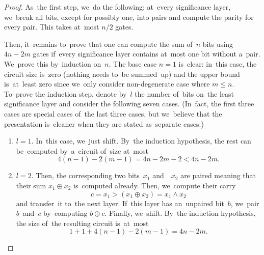 \documentclass[sigconf, review, anonymous]{acmart}
\begin{document}
\begin{proof}
    As~the first step, we~do the following: at~every significance layer,
    we~break all bits, except for possibly one, into pairs and compute
    the parity for every pair. This takes at~most $n/2$ gates.

    \begin{center}
    \end{center}

    Then, it~remains to~prove that one can compute the sum of~$n$ bits
    using $4n-2m$ gates if~every significance layer contains at~most one bit
    without a~pair. We~prove this by~induction on~$n$. The base case $n=1$ is~clear: in~this case, the circuit size is~zero (nothing needs to~be summed~up) and the upper bound is~at~least zero since we~only consider
    non-degenerate case where $m \le n$. To~prove the induction step,
    denote by~$l$ the number of~bits on~the least significance layer and consider the following seven cases. (In~fact, the first three cases are special cases of~the last three cases, but we~believe that the presentation is~cleaner when they are stated
    as~separate cases.)

    \begin{enumerate}
        \item $l=1$. In~this case, we~just shift.
        By~the induction hypothesis, the rest can be~computed by~a~circuit
        of~size at~most
        \[4(n-1)-2(m-1)=4n-2m-2<4n-2m.\]

        \item $l=2$. Then, the corresponding two bits~$x_1$ and~~$x_2$ are paired meaning that their sum $x_1 \oplus x_2$ is~computed already.
        Then, we~compute their carry
        \[c=x_1 > (x_1 \oplus x_2)=x_1 \land x_2\]
        and transfer~it to~the next layer.
        If~this layer has an~unpaired bit~$b$, we~pair $b$~and~$c$
        by~computing $b \oplus c$. Finally, we~shift.
        By~the induction hypothesis, the size of~the resulting circuit is~at~most
        \[1+1+4(n-1)-2(m-1)=4n-2m.\]


\end{enumerate}
\end{proof}
\end{document}
